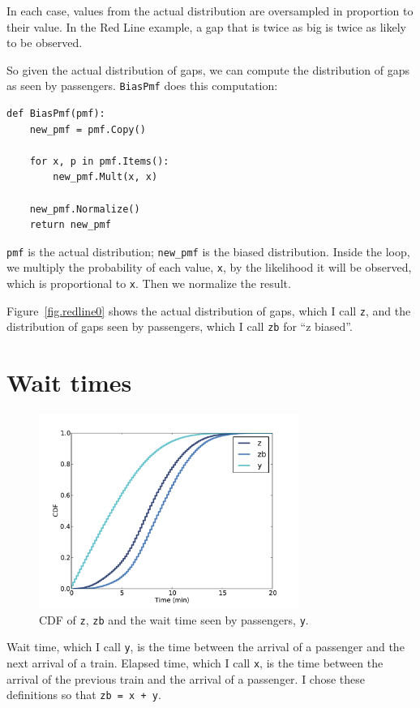 \documentclass[12pt]{book}
\begin{document}
In each case, values from the actual distribution are
oversampled in proportion to their value.  In the Red Line example,
a gap that is twice as big is twice as likely to be observed.

So given the actual distribution of gaps, we can compute the
distribution of gaps as seen by passengers.  {\tt BiasPmf}
does this computation:

\begin{verbatim}
def BiasPmf(pmf):
    new_pmf = pmf.Copy()

    for x, p in pmf.Items():
        new_pmf.Mult(x, x)
        
    new_pmf.Normalize()
    return new_pmf
\end{verbatim}

{\tt pmf} is the actual distribution; \verb"new_pmf" is the
biased distribution.  Inside the loop, we multiply the
probability of each value, {\tt x}, by the likelihood it will
be observed, which is proportional to {\tt x}.  Then we
normalize the result.

Figure~\ref{fig.redline0} shows the actual distribution of gaps, which
I call {\tt z}, and the distribution of gaps seen by passengers,
which I call {\tt zb} for ``z biased''.  


\section{Wait times}

\begin{figure}
\centerline{\includegraphics[height=2.5in]{figs/redline2.pdf}}
\caption{CDF of {\tt z}, {\tt zb} and the wait time seen
by passengers, {\tt y}. }
\label{fig.redline2}
\end{figure}

Wait time, which I call {\tt y}, is the time between the arrival
of a passenger and the next arrival of a train.  Elapsed time, which I
call {\tt x}, is the time between the arrival of the previous
train and the arrival of a passenger.  I chose these definitions
so that {\tt zb = x + y}.
\end{document}
